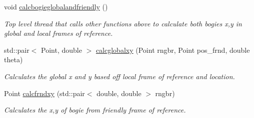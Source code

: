 \begin{DoxyCompactItemize}
\mbox{\label{classBogieposInterface_a4cdda06dbe106fa960365d9f59ba572f}} 
void \hyperlink{classBogieposInterface_a4cdda06dbe106fa960365d9f59ba572f}{calcbogieglobalandfriendly} ()
\begin{DoxyCompactList}\small\item\em Top level thread that calls other functions above to calculate both bogies x,y in global and local frames of reference. \end{DoxyCompactList}\item 
std\+::pair$<$ Point, double $>$ \hyperlink{classBogieposInterface_a0d6962250b64da519be1e8ac46a7afa7}{calcglobalxy} (Point rngbr, Point pos\+\_\+frnd, double theta)
\begin{DoxyCompactList}\small\item\em Calculates the global x and y based off local frame of reference and location. \end{DoxyCompactList}\item 
Point \hyperlink{classBogieposInterface_abdbf2caf087cb39dcf35700ecf9128bd}{calcfrndxy} (std\+::pair$<$ double, double $>$ rngbr)
\begin{DoxyCompactList}\small\item\em Calculates the x,y of bogie from friendly frame of reference. \end{DoxyCompactList}\end{DoxyCompactItemize}
